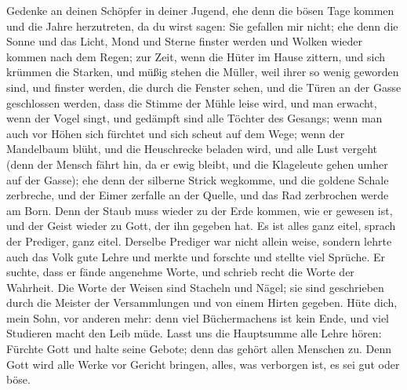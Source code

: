  Gedenke an deinen Schöpfer in deiner Jugend, ehe denn die
bösen Tage kommen und die Jahre herzutreten, da du wirst sagen: Sie
gefallen mir nicht;  ehe denn die Sonne und das Licht,
Mond und Sterne finster werden und Wolken wieder kommen nach dem Regen;
 zur Zeit, wenn die Hüter im Hause zittern, und sich
krümmen die Starken, und müßig stehen die Müller, weil ihrer so wenig
geworden sind, und finster werden, die durch die Fenster sehen,
 und die Türen an der Gasse geschlossen werden, dass die
Stimme der Mühle leise wird, und man erwacht, wenn der Vogel singt, und
gedämpft sind alle Töchter des Gesangs;  wenn man auch vor
Höhen sich fürchtet und sich scheut auf dem Wege; wenn der Mandelbaum
blüht, und die Heuschrecke beladen wird, und alle Lust vergeht (denn der
Mensch fährt hin, da er ewig bleibt, und die Klageleute gehen umher auf
der Gasse);  ehe denn der silberne Strick wegkomme, und
die goldene Schale zerbreche, und der Eimer zerfalle an der Quelle, und
das Rad zerbrochen werde am Born.  Denn der Staub muss
wieder zu der Erde kommen, wie er gewesen ist, und der Geist wieder zu
Gott, der ihn gegeben hat.  Es ist alles ganz eitel,
sprach der Prediger, ganz eitel.  Derselbe Prediger war
nicht allein weise, sondern lehrte auch das Volk gute Lehre und merkte
und forschte und stellte viel Sprüche.  Er suchte, dass
er fände angenehme Worte, und schrieb recht die Worte der Wahrheit.
 Die Worte der Weisen sind Stacheln und Nägel; sie sind
geschrieben durch die Meister der Versammlungen und von einem Hirten
gegeben.  Hüte dich, mein Sohn, vor anderen mehr: denn
viel Büchermachens ist kein Ende, und viel Studieren macht den Leib
müde.  Lasst uns die Hauptsumme alle Lehre hören: Fürchte
Gott und halte seine Gebote; denn das gehört allen Menschen zu.
 Denn Gott wird alle Werke vor Gericht bringen, alles,
was verborgen ist, es sei gut oder böse.
